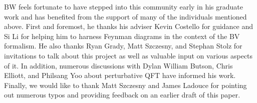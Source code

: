 BW feels fortunate to have stepped into this community early in his graduate work and has benefited from the support of many of the individuals mentioned above. 
First and foremost, he thanks his adviser Kevin Costello for guidance and Si Li for helping him to harness Feynman diagrams in the context of the BV formalism. 
He also thanks Ryan Grady, Matt Szczesny, and Stephan Stolz for invitations to talk about this project as well as valuable input on various aspects of it. 
In addition, numerous discussions with Dylan William Butson, Chris Elliott, and Philsang Yoo about perturbative QFT have informed his work. 
Finally, we would like to thank Matt Szczesny and James Ladouce for pointing out numerous typos and providing feedback on an earlier draft of this paper.
